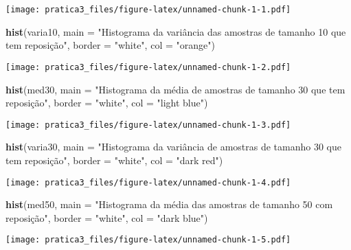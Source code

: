 \documentclass[]{article}
\newenvironment{Shaded}{\begin{snugshade}}{\end{snugshade}}
\newcommand{\KeywordTok}[1]{\textcolor[rgb]{0.13,0.29,0.53}{\textbf{#1}}}
\newcommand{\DataTypeTok}[1]{\textcolor[rgb]{0.13,0.29,0.53}{#1}}
\newcommand{\StringTok}[1]{\textcolor[rgb]{0.31,0.60,0.02}{#1}}
\newcommand{\NormalTok}[1]{#1}
\begin{document}
\texttt{[image: pratica3\_files/figure-latex/unnamed-chunk-1-1.pdf]}

\begin{Shaded}
\begin{Highlighting}[]
\KeywordTok{hist}\NormalTok{(varia10, }\DataTypeTok{main =} \StringTok{"Histograma da variância das amostras de tamanho 10 que tem reposição"}\NormalTok{, }\DataTypeTok{border =} \StringTok{"white"}\NormalTok{, }\DataTypeTok{col =} \StringTok{"orange"}\NormalTok{)}
\end{Highlighting}
\end{Shaded}

\texttt{[image: pratica3\_files/figure-latex/unnamed-chunk-1-2.pdf]}

\begin{Shaded}
\begin{Highlighting}[]
\KeywordTok{hist}\NormalTok{(med30, }\DataTypeTok{main =} \StringTok{"Histograma da média de amostras de tamanho 30 que tem reposição"}\NormalTok{, }\DataTypeTok{border =} \StringTok{"white"}\NormalTok{, }\DataTypeTok{col =} \StringTok{"light blue"}\NormalTok{)}
\end{Highlighting}
\end{Shaded}

\texttt{[image: pratica3\_files/figure-latex/unnamed-chunk-1-3.pdf]}

\begin{Shaded}
\begin{Highlighting}[]
\KeywordTok{hist}\NormalTok{(varia30, }\DataTypeTok{main =} \StringTok{"Histograma da variância de amostras de tamanho 30 que tem reposição"}\NormalTok{, }\DataTypeTok{border =} \StringTok{"white"}\NormalTok{, }\DataTypeTok{col =} \StringTok{"dark red"}\NormalTok{)}
\end{Highlighting}
\end{Shaded}

\texttt{[image: pratica3\_files/figure-latex/unnamed-chunk-1-4.pdf]}

\begin{Shaded}
\begin{Highlighting}[]
\KeywordTok{hist}\NormalTok{(med50, }\DataTypeTok{main =} \StringTok{"Histograma da média das amostras de tamanho 50 com reposição"}\NormalTok{, }\DataTypeTok{border =} \StringTok{"white"}\NormalTok{, }\DataTypeTok{col =} \StringTok{"dark blue"}\NormalTok{)}
\end{Highlighting}
\end{Shaded}

\texttt{[image: pratica3\_files/figure-latex/unnamed-chunk-1-5.pdf]}
\end{document}
